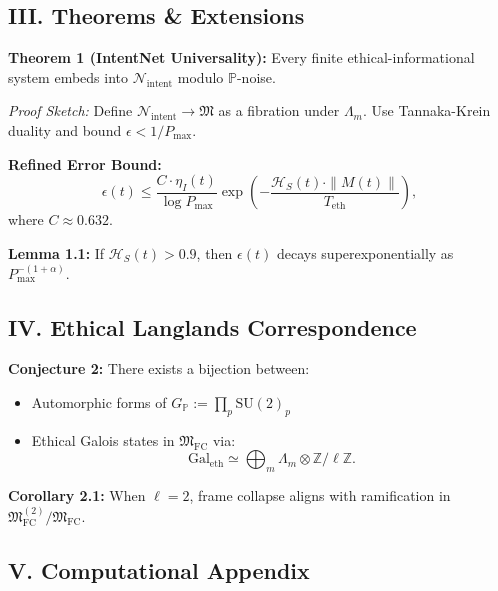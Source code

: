 \documentclass[12pt]{article}
\begin{document}
\subsection*{III. Theorems \& Extensions}

\textbf{Theorem 1 (IntentNet Universality):}
Every finite ethical-informational system embeds into $\mathcal{N}_{\text{intent}}$ modulo $\mathbb{P}$-noise.

\textit{Proof Sketch:} 
Define $\mathcal{N}_{\text{intent}} \to \mathfrak{M}$ as a fibration under $\Lambda_m$. Use Tannaka-Krein duality and bound $\epsilon < 1/P_{\text{max}}$.

\textbf{Refined Error Bound:}
\[
\epsilon(t) \leq \frac{C \cdot \eta_I(t)}{\log P_{\text{max}}} \exp\left(-\frac{\mathcal{H}_S(t) \cdot \|M(t)\|}{T_{\text{eth}}}\right),
\]
where $C \approx 0.632$.

\textbf{Lemma 1.1:}
If $\mathcal{H}_S(t) > 0.9$, then $\epsilon(t)$ decays superexponentially as $P_{\text{max}}^{-(1 + \alpha)}$.

\subsection*{IV. Ethical Langlands Correspondence}
\textbf{Conjecture 2:}
There exists a bijection between:
\begin{itemize}
  \item Automorphic forms of $G_{\mathbb{P}} := \prod_{p} \text{SU}(2)_p$
  \item Ethical Galois states in $\mathfrak{M}_{\text{FC}}$ via:
\[
\text{Gal}_{\text{eth}} \simeq \bigoplus_{m} \Lambda_m \otimes \mathbb{Z}/\ell\mathbb{Z}.
\]
\end{itemize}

\textbf{Corollary 2.1:}
When $\ell = 2$, frame collapse aligns with ramification in $\mathfrak{M}_{\text{FC}}^{(2)}/\mathfrak{M}_{\text{FC}}$.

\begin{center}
\end{center}

\subsection*{V. Computational Appendix}
\end{document}
